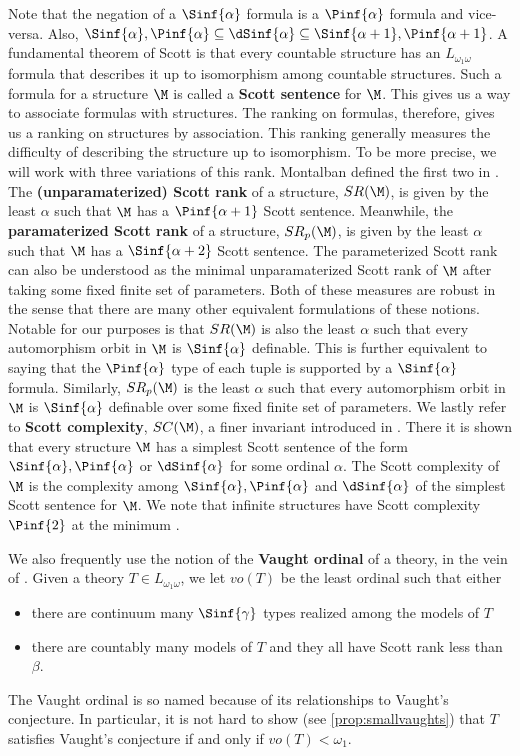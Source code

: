 \documentclass{amsart}
\renewcommand{\-}{\text{-}}
\begin{document}
Note that the negation of a $\Sinf{\alpha}$ formula is a $ \Pinf{\alpha}$ formula and vice-versa.
Also, $\Sinf{\alpha}, \Pinf{\alpha}\subseteq \dSinf{\alpha}\subseteq \Sinf{\alpha+1}, \Pinf{\alpha+1}$.
A fundamental theorem of Scott \cite{Sco65} is that every countable structure has an $L_{\omega_1\omega}$ formula that describes it up to isomorphism among countable structures.
Such a formula for a structure $\M$ is called a \textbf{Scott sentence} for $\M$.
This gives us a way to associate formulas with structures.
The ranking on formulas, therefore, gives us a ranking on structures by association.
This ranking generally measures the difficulty of describing the structure up to isomorphism.
To be more precise, we will work with three variations of this rank.
Montalban defined the first two in \cite{MonSR}.
The \textbf{(unparamaterized) Scott rank} of a structure, $SR(\M)$, is given by the least $\alpha$ such that $\M$ has a $\Pinf{\alpha+1}$ Scott sentence.
Meanwhile, the \textbf{paramaterized Scott rank} of a structure, $SR_p(\M)$, is given by the least $\alpha$ such that $\M$ has a $\Sinf{\alpha+2}$ Scott sentence.
The parameterized Scott rank can also be understood as the minimal unparamaterized Scott rank of $\M$ after taking some fixed finite set of parameters.
Both of these measures are robust in the sense that there are many other equivalent formulations of these notions.
Notable for our purposes is that $SR(\M)$ is also the least $\alpha$ such that every automorphism orbit in $\M$ is $\Sinf{\alpha}$ definable.
This is further equivalent to saying that the $\Pinf{\alpha}$ type of each tuple is supported by a $\Sinf{\alpha}$ formula. 
Similarly, $SR_p(\M)$ is the least $\alpha$ such that every automorphism orbit in $\M$ is $\Sinf{\alpha}$ definable over some fixed finite set of parameters.
We lastly refer to \textbf{Scott complexity}, $SC(\M)$, a finer invariant introduced in \cite{AGNHTT}.
There it is shown that every structure $\M$ has a simplest Scott sentence of the form $\Sinf{\alpha}, \Pinf{\alpha}$ or $\dSinf{\alpha}$ for some ordinal $\alpha$.
The Scott complexity of $\M$ is the complexity among $\Sinf{\alpha}, \Pinf{\alpha}$ and $\dSinf{\alpha}$ of the simplest Scott sentence for $\M$.
We note that infinite structures have Scott complexity $\Pinf{2}$ at the minimum \cite[Theorem 5.1]{AGNHTT,miller1983}.

We also frequently use the notion of the \textbf{Vaught ordinal} of a theory, in the vein of \cite{GM23}.
Given a theory $T\in  L_{\omega_1\omega}$, we let $vo(T)$ be the least ordinal such that either
\begin{itemize}
	\item there are continuum many $\Sinf{\gamma}$ types realized among the models of $T$
	\item there are countably many models of $T$ and they all have Scott rank less than $\beta$.
\end{itemize}
The Vaught ordinal is so named because of its relationships to Vaught's conjecture.
In particular, it is not hard to show (see \cref{prop:smallvaughts}) that $T$ satisfies Vaught's conjecture if and only if $vo(T)<\omega_1$.
\end{document}
